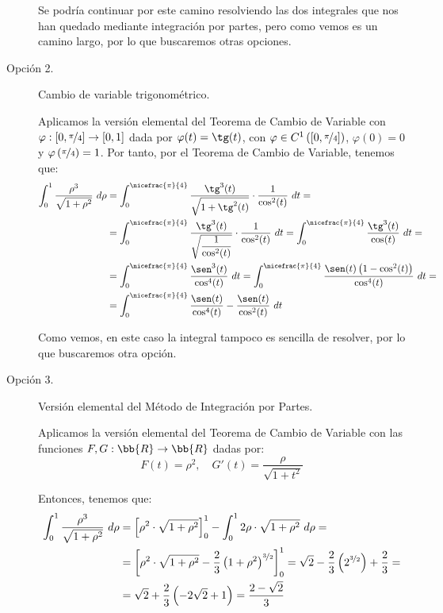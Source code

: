 \begin{ejercicio}
\begin{description}
        Se podría continuar por este camino resolviendo las dos integrales que nos han quedado mediante integración por partes,
        pero como vemos es un camino largo, por lo que buscaremos otras opciones.

        \item [Opción 2.] Cambio de variable trigonométrico.
        
        Aplicamos la versión elemental del Teorema de Cambio de Variable con $\varphi:\left[0,\nicefrac{\pi}{4}\right]\to [0,1]$ dada por $\varphi(t)=\tg(t)$, con $\varphi\in C^1\left([0,\nicefrac{\pi}{4}]\right)$, $\varphi(0)=0$ y $\varphi\left(\nicefrac{\pi}{4}\right)=1$. Por tanto, por el Teorema de Cambio de Variable, tenemos que:
        \begin{align*}
            \int_0^1 \dfrac{\rho^3}{\sqrt{1+\rho^2}} ~d\rho &= \int_0^{\nicefrac{\pi}{4}} \dfrac{\tg^3(t)}{\sqrt{1+\tg^2(t)}}\cdot \dfrac{1}{\cos^2(t)}~dt =\\
            &= \int_0^{\nicefrac{\pi}{4}} \dfrac{\tg^3(t)}{\sqrt{\dfrac{1}{\cos^2(t)}}}\cdot \dfrac{1}{\cos^2(t)}~dt
            = \int_0^{\nicefrac{\pi}{4}} \dfrac{\tg^3(t)}{\cos(t)}~dt =\\
            &= \int_0^{\nicefrac{\pi}{4}} \dfrac{\sen^3(t)}{\cos^4(t)}~dt
            = \int_0^{\nicefrac{\pi}{4}} \dfrac{\sen(t)\left(1-\cos^2(t)\right)}{\cos^4(t)}~dt =\\
            &= \int_0^{\nicefrac{\pi}{4}} \dfrac{\sen(t)}{\cos^4(t)} - \dfrac{\sen(t)}{\cos^2(t)}~dt
        \end{align*}

        Como vemos, en este caso la integral tampoco es sencilla de resolver, por lo que buscaremos otra opción.

        \item [Opción 3.] Versión elemental del Método de Integración por Partes.
        
        Aplicamos la versión elemental del Teorema de Cambio de Variable con las funciones $F,G:\bb{R}\to \bb{R}$ dadas por:
        \begin{equation*}
            F(t) = \rho^2, \quad G'(t) = \dfrac{\rho}{\sqrt{1+t^2}}
        \end{equation*}

        Entonces, tenemos que:
        \begin{align*}
            \int_0^1 \dfrac{\rho^3}{\sqrt{1+\rho^2}} ~d\rho &= \left[\rho^2\cdot \sqrt{1+\rho^2}\right]_0^1 - \int_0^1 2\rho\cdot \sqrt{1+\rho^2}~d\rho =\\
            &= \left[\rho^2\cdot \sqrt{1+\rho^2} - \dfrac{2}{3}\left(1+\rho^2\right)^{\nicefrac{3}{2}}\right]_0^1
            = \sqrt{2} - \dfrac{2}{3}\left(2^{\nicefrac{3}{2}}\right)+\dfrac{2}{3}
            =\\&= \sqrt{2} + \dfrac{2}{3}\left(-2\sqrt{2} + 1\right)
            = \dfrac{2-\sqrt{2}}{3}
        \end{align*}


\end{description}
\end{ejercicio}
